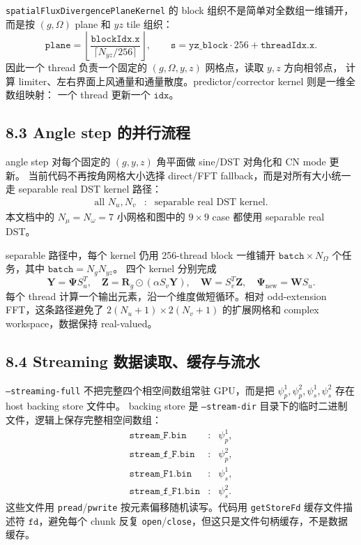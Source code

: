 \documentclass[11pt,a4paper]{ctexart}
\begin{document}
\texttt{spatialFluxDivergencePlaneKernel} 的 block 组织不是简单对全数组一维铺开，而是按
\((g,\Omega)\) plane 和 \(yz\) tile 组织：
\begin{equation}
  \texttt{plane}=\left\lfloor
  \frac{\texttt{blockIdx.x}}{\lceil N_{yz}/256\rceil}
  \right\rfloor,\qquad
  \texttt{s}=\texttt{yz\_block}\cdot256+\texttt{threadIdx.x}.
\end{equation}
因此一个 thread 负责一个固定的 \((g,\Omega,y,z)\) 网格点，读取 \(y,z\) 方向相邻点，
计算 limiter、左右界面上风通量和通量散度。predictor/corrector kernel 则是一维全数组映射：
一个 thread 更新一个 \(\texttt{idx}\)。

\subsection*{8.3 Angle step 的并行流程}

angle step 对每个固定的 \((g,y,z)\) 角平面做 sine/DST 对角化和 CN mode 更新。
当前代码不再按角网格大小选择 direct/FFT fallback，而是对所有大小统一走 separable
real DST kernel 路径：
\begin{equation}
\begin{array}{lll}
\text{all }N_u,N_v
&:& \text{separable real DST kernel}.
\end{array}
\end{equation}
本文档中的 \(N_\mu=N_\omega=7\) 小网格和图中的 \(9\times9\) case 都使用 separable
real DST。

separable 路径中，每个 kernel 仍用 256-thread block 一维铺开
\(\texttt{batch}\times N_\Omega\) 个任务，其中 \(\texttt{batch}=N_gN_{yz}\)。
四个 kernel 分别完成
\begin{equation}
  \mathbf Y=\mathbf\Psi S_u^T,\quad
  \mathbf Z=\mathbf R_g\odot(\alpha S_v\mathbf Y),\quad
  \mathbf W=S_v^T\mathbf Z,\quad
  \mathbf\Psi_{\mathrm{new}}=\mathbf W S_u.
\end{equation}
每个 thread 计算一个输出元素，沿一个维度做短循环。相对 odd-extension FFT，这条路径避免了
\(2(N_u+1)\times2(N_v+1)\) 的扩展网格和 complex workspace，数据保持 real-valued。

\subsection*{8.4 Streaming 数据读取、缓存与流水}

\texttt{--streaming-full} 不把完整四个相空间数组常驻 GPU，而是把
\(\psi^1_p,\psi^2_p,\psi^1_s,\psi^2_s\) 存在 host backing store 文件中。
backing store 是 \texttt{--stream-dir} 目录下的临时二进制文件，逻辑上保存完整相空间数组：
\begin{equation}
\begin{array}{lll}
\texttt{stream\_F.bin}   &:& \psi^1_p,\\
\texttt{stream\_f\_F.bin} &:& \psi^2_p,\\
\texttt{stream\_F1.bin}  &:& \psi^1_s,\\
\texttt{stream\_f\_F1.bin}&:& \psi^2_s.
\end{array}
\end{equation}
这些文件用 \texttt{pread}/\texttt{pwrite} 按元素偏移随机读写。代码用
\texttt{getStoreFd} 缓存文件描述符 \(\texttt{fd}\)，避免每个 chunk 反复
\texttt{open}/\texttt{close}，但这只是文件句柄缓存，不是数据缓存。
\end{document}
